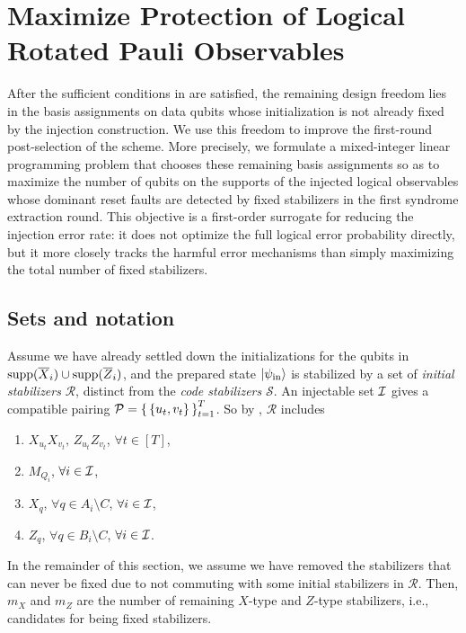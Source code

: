 \section{Maximize Protection of Logical Rotated Pauli Observables}
\label{sec:max-protection-injected-supports}

After the sufficient conditions in  are satisfied, the remaining design freedom lies in the basis assignments on data qubits whose initialization is not already fixed by the injection construction. We use this freedom to improve the first-round post-selection of the scheme. More precisely, we formulate a mixed-integer linear programming problem that chooses these remaining basis assignments so as to maximize the number of qubits on the supports of the injected logical observables whose dominant reset faults are detected by fixed stabilizers in the first syndrome extraction round. This objective is a first-order surrogate for reducing the injection error rate: it does not optimize the full logical error probability directly, but it more closely tracks the harmful error mechanisms than simply maximizing the total number of fixed stabilizers.

\subsection{Sets and notation}

Assume we have already settled down the initializations for the qubits in $ \mathrm{supp}(\overline{X}_i) \cup \mathrm{supp}(\overline{Z}_i) $,
and the prepared state $ \ket{\psi_{\mathrm{in}}} $ is stabilized by a set of \emph{initial stabilizers} $ \mathcal{R} $,
distinct from the \emph{code stabilizers} $ \mathcal{S} $.
An injectable set $ \mathcal{I} $ gives a compatible pairing $ \mathcal{P} = \set{\{u_t,v_t\}}_{t=1}^T $.
So by , $ \mathcal{R} $ includes
\begin{enumerate}
  \item $ X_{u_t}X_{v_t},\, Z_{u_t}Z_{v_t} $, $ \forall t\in [T] $,
  \item $ M_{Q_i} $, $ \forall i \in \mathcal{I} $,
  \item $ X_q $, $ \forall q \in A_i \setminus C$, $\forall i \in \mathcal{I}$,
  \item $ Z_q $, $ \forall q \in B_i \setminus C$, $\forall i \in \mathcal{I}$.
\end{enumerate}

In the remainder of this section,
we assume we have removed the stabilizers that can never be fixed
due to not commuting with some initial stabilizers in $ \mathcal{R} $.
Then, \( m_X \) and \( m_Z \) are the number of remaining $X$-type and $Z$-type stabilizers, i.e., candidates for being fixed stabilizers.

